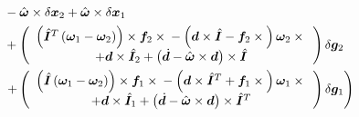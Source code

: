 \documentclass[10pt,fleqn,subeqn]{report}
\newcommand{\T}[1]{\bm{#1}}
\newcommand{\TT}[1]{\bm{#1}}
\begin{document}
\begin{align}
	& \quad\quad\quad
		- \hat{\T{\omega}}\times\delta\T{x}_2
		+ \hat{\T{\omega}}\times\delta\T{x}_1
	\nonumber \\
	& \quad\quad\quad
		+ \plbr{\cvvect{
			\plbr{
				\hat{\TT{I}}^T \plbr{
					\T{\omega}_1
					- \T{\omega}_2
				}
			} \times \T{f}_2\times{}
			- \plbr{
				\T{d}\times\hat{\TT{I}}
				- \T{f}_2\times{}
			} \T{\omega}_2\times{} \\
			+ \T{d}\times\hat{\TT{I}}_2
			+ \plbr{
				\dot{\T{d}}
				- \hat{\T{\omega}}\times\T{d}
			}\times\hat{\TT{I}}
		}} \delta\T{g}_2
	\nonumber \\
	& \quad\quad\quad
	\rplbr{
		+ \plbr{\cvvect{
			\plbr{
				\hat{\TT{I}} \plbr{
					\T{\omega}_1
					- \T{\omega}_2
				}
			} \times \T{f}_1\times{}
			- \plbr{
				\T{d}\times\hat{\TT{I}}^T
				+ \T{f}_1\times{}
			}\T{\omega}_1\times{} \\
			+ \T{d}\times\hat{\TT{I}}_1
			+ \plbr{
				\dot{\T{d}}
				- \hat{\T{\omega}}\times\T{d}
			}\times\hat{\TT{I}}^T
		}} \delta\T{g}_1
	}
\end{align}

\end{document}
